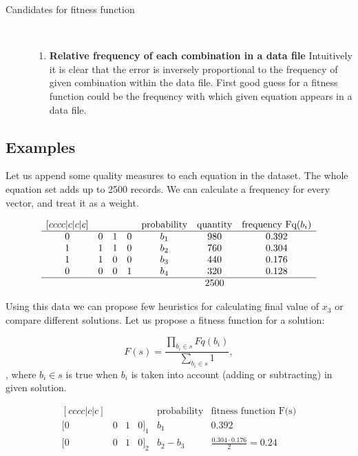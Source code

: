 \begin{description}
    \item[Candidates for fitness function] \hfill \\
    \begin{enumerate}
        \item \textbf{Relative frequency of each combination in a data file}
        Intuitively it is clear that the error is inversely proportional to the frequency of given combination within the data file.
        First good guess for a fitness function could be the frequency with which given equation appears in a data file.
    \end{enumerate}
\end{description}

\subsection{Examples}
Let us append some quality measures to each equation in the dataset.
The whole equation set adds up to 2500 records.
We can calculate a frequency for every vector, and treat it as a weight.

\begin{equation}
\begin{matrix}[cccc|c|c|c]
     &  &  &  & \mbox{probability} & \mbox{quantity} & \mbox{frequency Fq($b_i$)} \\
    \hline
    0 & 0 & 1 & 0 & b_1 & 980 & 0.392 \\
    1 & 1 & 1 & 0 & b_2 & 760 & 0.304 \\ 
    1 & 1 & 0 & 0 & b_3 & 440 & 0.176 \\ 
    0 & 0 & 0 & 1 & b_4 & 320 & 0.128 \\ 
    \hline
     &  &  &  &  & 2500 & \\ 
\end{matrix}
\end{equation}

Using this data we can propose few heuristics for calculating final value of $x_3$ or compare different solutions.
Let us propose a fitness function for a solution:

\begin{equation}
    F(s) = \frac{\displaystyle\prod_{b_{i} \in s} Fq(b_i)}{ \displaystyle\sum_{b_i \in s}1},
\end{equation},
where $b_i \in s$ is true when $b_i$ is taken into account (adding or subtracting) in given solution.

\begin{equation}
\begin{matrix}[cccc|c|c]
     &  &  &  & \mbox{probability} & \mbox{fitness function F(s)} \\
    \hline
    [0 & 0 & 1 & 0]_1 & b_1 & 0.392 \\
    [0 & 0 & 1 & 0]_2 & b_2 - b_3 & \frac{0.304 \cdot 0.176}{2} = 0.24 \\ 
\end{matrix}
\end{equation}


